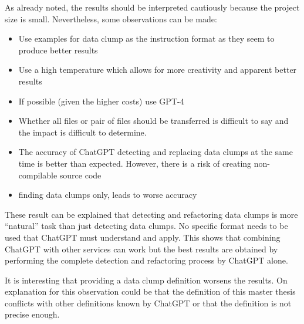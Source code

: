 As already noted, the results should be interpreted cautiously because the project size is small. Nevertheless, some observations can be made:

\begin{itemize}
    \item Use examples for data clump as the instruction format as they seem to produce better results
    \item Use a high temperature which allows for more creativity and apparent better results
    \item If possible (given the higher costs) use GPT-4
    \item Whether all files or pair of files should be transferred is difficult to say and the impact is difficult to determine. 
    \item The accuracy of ChatGPT detecting and replacing data clumps at the same time is better than expected. However, there is a risk of creating non-compilable source code
    \item finding data clumps only, leads to worse accuracy
\end{itemize}
These result can be explained that detecting and refactoring data clumps is more \enquote{natural} task than just detecting data clumps. No specific format needs to be used that ChatGPT must understand and apply. This shows that combining ChatGPT with other services can work but the best results are obtained by performing the complete detection and refactoring process by ChatGPT alone. 

It is interesting that providing a data clump definition worsens the results. On explanation for this observation could be that the definition of this master thesis conflicts with other definitions known by ChatGPT or that the definition is not precise enough.


